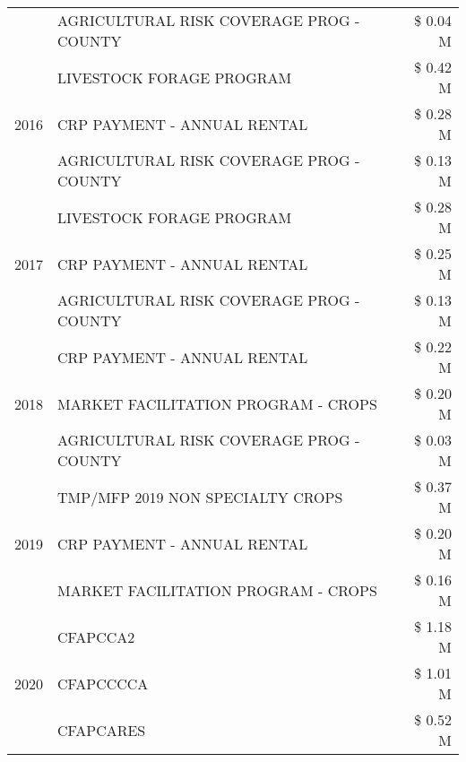 \begin{tabular}{llr}
 & AGRICULTURAL RISK COVERAGE PROG - COUNTY & \$ 0.04 M \\
\cline{1-3}
\multirow[t]{3}{*}{2016} & LIVESTOCK FORAGE PROGRAM & \$ 0.42 M \\
 & CRP PAYMENT - ANNUAL RENTAL & \$ 0.28 M \\
 & AGRICULTURAL RISK COVERAGE PROG - COUNTY & \$ 0.13 M \\
\cline{1-3}
\multirow[t]{3}{*}{2017} & LIVESTOCK FORAGE PROGRAM & \$ 0.28 M \\
 & CRP PAYMENT - ANNUAL RENTAL & \$ 0.25 M \\
 & AGRICULTURAL RISK COVERAGE PROG - COUNTY & \$ 0.13 M \\
\cline{1-3}
\multirow[t]{3}{*}{2018} & CRP PAYMENT - ANNUAL RENTAL & \$ 0.22 M \\
 & MARKET FACILITATION PROGRAM - CROPS & \$ 0.20 M \\
 & AGRICULTURAL RISK COVERAGE PROG - COUNTY & \$ 0.03 M \\
\cline{1-3}
\multirow[t]{3}{*}{2019} & TMP/MFP 2019 NON SPECIALTY CROPS & \$ 0.37 M \\
 & CRP PAYMENT - ANNUAL RENTAL & \$ 0.20 M \\
 & MARKET FACILITATION PROGRAM - CROPS & \$ 0.16 M \\
\cline{1-3}
\multirow[t]{3}{*}{2020} & CFAPCCA2 & \$ 1.18 M \\
 & CFAPCCCCA & \$ 1.01 M \\
 & CFAPCARES & \$ 0.52 M \\
\cline{1-3}
\bottomrule
\end{tabular}
